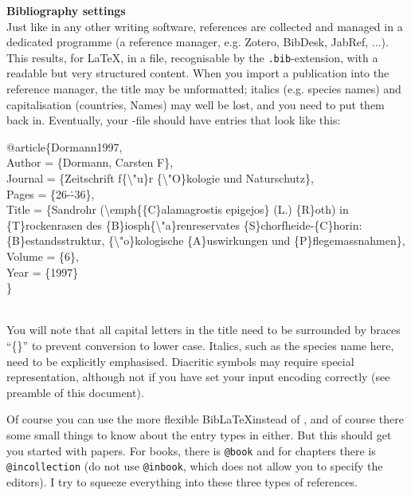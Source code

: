 \begin{boxmd}
	\textbf{Bibliography settings}\\
	Just like in any other writing software, references are collected and managed in a dedicated programme (a reference manager, e.g. Zotero, BibDesk, JabRef, ...). This results, for \LaTeX, in a \BibTeX\/ file, recognisable by the \texttt{.bib}-extension, with a readable but very structured content. When you import a publication into the reference manager, the title may be unformatted; italics (e.g. species names) and capitalisation (countries, Names) may well be lost, and you need to put them back in. 
	Eventually, your \BibTeX-file should have entries that look like this:\\
	\begin{footnotesize}
	\begin{ttfamily}	
	@article\{Dormann1997,\\
	Author = \{Dormann, Carsten F\}, \\
	Journal = \{Zeitschrift f\{\textbackslash"u\}r \{\textbackslash"O\}kologie und Naturschutz\},\\
	Pages = \{26-\.-36\},\\
	Title = \{Sandrohr (\textbackslash emph\{\{C\}alamagrostis epigejos\} (L.) \{R\}oth) in \{T\}rockenrasen des \{B\}iosph\{\textbackslash "a\}renreservates \{S\}chorfheide-\{C\}horin: \{B\}estandsstruktur, \{\textbackslash"o\}kologische \{A\}uswirkungen und \{P\}flegemassnahmen\},\\
	Volume = \{6\},\\
	Year = \{1997\}\\
	\}
	\end{ttfamily}
	\end{footnotesize}\\
	You will note that all capital letters in the title need to be surrounded by braces ``\{\}'' to prevent conversion to lower case. Italics, such as the species name here, need to be explicitly emphasised. Diacritic symbols may require special representation, although not if you have set your input encoding correctly (see preamble of this document).
	
	Of course you can use the more flexible Bib\LaTeX instead of \BibTeX, and of course there some small things to know about the entry types in either. But this should get you started with papers. For books, there is \texttt{\makeatletter @\makeatother book} and for chapters there is \texttt{\makeatletter @\makeatother incollection} (do not use \texttt{\makeatletter @\makeatother inbook}, which does not allow you to specify the editors). I try to squeeze everything into these three types of references.
	

\end{boxmd}
